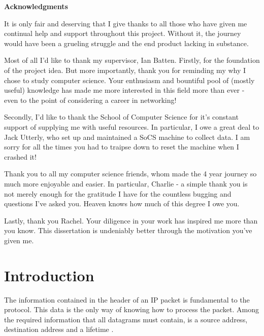 \documentclass[12pt,twoside]{article}
\begin{document}
\newpage
\begin{center}
	\textbf{Acknowledgments}
\end{center}
It is only fair and deserving that I give thanks to all those who have given me continual help and support throughout this project. Without it, the journey would have been a grueling struggle and the end product lacking in substance.

Most of all I'd like to thank my supervisor, Ian Batten. Firstly, for the foundation of the project idea. But more importantly, thank you for reminding my why I chose to study computer science. Your enthusiasm and bountiful pool of (mostly useful) knowledge has made me more interested in this field more than ever - even to the point of considering a career in networking!

Secondly, I'd like to thank the School of Computer Science for it's constant support of supplying me with useful resources. In particular, I owe a great deal to Jack Utterly, who set up and maintained a SoCS machine to collect data. I am sorry for all the times you had to traipse down to reset the machine when I crashed it!

Thank you to all my computer science friends, whom made the 4 year journey so much more enjoyable and easier. In particular, Charlie - a simple thank you is not merely enough for the gratitude I have for the countless bugging and questions I've asked you. Heaven knows how much of this degree I owe you.

Lastly, thank you Rachel. Your diligence in your work has inspired me more than you know. This dissertation is undeniably better through the motivation you've given me.
\newpage
\tableofcontents

\newpage
\section{Introduction}
The information contained in the header of an IP packet is fundamental to the protocol. This data is the only way of knowing how to process the packet. Among the required information that all datagrams must contain, is a source address, destination address and a lifetime \cite{rfc791}.
\end{document}
